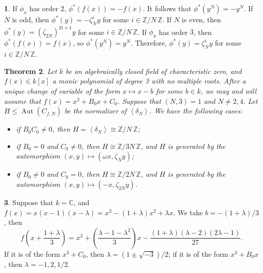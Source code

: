 \documentclass{amsart}[11pt]
\newtheorem{thm}{Theorem}[section]
\theoremstyle{definition}
\newtheorem{sect}[thm]{}
\numberwithin{equation}{section}
\theoremstyle{notitle}
\begin{document}
\begin{sect}
If $\phi_x$ has order 2, $\phi^*(f(x))= -f(x)$. It follows that
$\phi^*(y^N)= - y^N$. If $N$ is odd, then $\phi^*(y)=
-\zeta_N^iy$ for some $i\in {\mathbb{Z}/ {N}\, \mathbb{Z}}$.  If $N$ is even, then
$\phi^*(y) = (\zeta_{2N})^{2i+1}y$ for some $i \in {\mathbb{Z}/ {N}\, \mathbb{Z}}$. If
$\phi_x$ has order $3$, then $\phi^*(f(x))=f(x)$, so
$\phi^*(y^N)= y^N$. Therefore, $\phi^*(y)= \zeta_N^i y$
for some $i\in {\mathbb{Z}/ {N}\, \mathbb{Z}}$.
\end{sect}

\begin{thm}\label{thm:normalizer-automorphism}
  Let $k$ be an algebraically closed field of characteristic zero, and
  $f(x)\in k[x]$ a monic polynomial of degree 3 with no multiple
  roots. After a unique change of variable of the form $x\mapsto x-b$
  for some $b\in k$, we may and will assume that $f(x)=x^3+B_0x+C_0$.
  Suppose that $(N, 3)=1$ and $N\neq 2, 4$. Let $H\leq \operatorname{Aut}(C_{f,N})$
  be the normalizer of ${\left\langle {\delta_N} \right\rangle}$. We have the following
  cases: 
  \begin{itemize}
  \item if $B_0C_0\neq 0$, then $H={\left\langle {\delta_N} \right\rangle}\cong {\mathbb{Z}/ {N}\, \mathbb{Z}}$;
  \item if $B_0=0$ and $C_0\neq 0$, then $H\cong {\mathbb{Z}/ {3N}\, \mathbb{Z}}$, and $H$
    is generated by the automorphism $(x,y)\mapsto (\omega x,
    \zeta_Ny)$;
  \item if $B_0\neq 0$ and $C_0=0$, then $H\cong {\mathbb{Z}/ {2N}\, \mathbb{Z}}$, and $H$
    is generated by the automorphism $(x,y)\mapsto (-x,
    \zeta_{2N}y)$. 
  \end{itemize}
\end{thm}
  
  
  
  
  
  
  
  
  
  
  
  

\begin{sect}\label{subsec:lambda}
  Suppose that $k={\mathbb{C}}$, and $f(x)=x(x-1)(x-\lambda)=
  x^3-(1+\lambda)x^2+\lambda x$. We take $b=-(1+\lambda)/3$, then
\[f\left(x+\frac{1+\lambda}{3}\right)=x^3+\left(\frac{\lambda-1-\lambda^2}{3}\right)x
-\frac{(1+\lambda)(\lambda-2)(2\lambda-1)}{27}.
\]
If it is of the form $x^3+C_0$, then $\lambda= (1\pm \sqrt{-3})/2$; if
it is of the form $x^3+B_0x$, then $\lambda= -1, 2, 1/2$.   
\end{sect}
\end{document}
